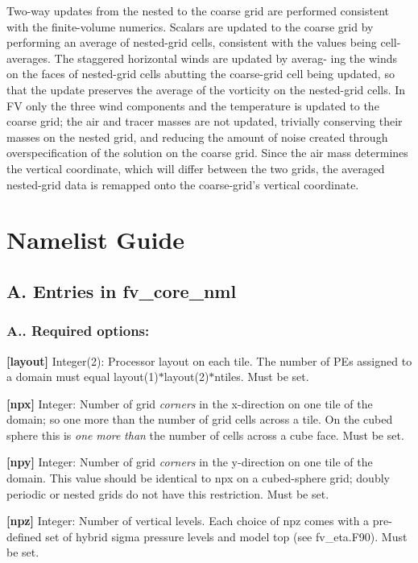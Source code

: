 Two-\/way updates from the nested to the coarse grid are performed consistent with the finite-\/volume numerics. Scalars are updated to the coarse grid by performing an average of nested-\/grid cells, consistent with the values being cell-\/averages. The staggered horizontal winds are updated by averag-\/ ing the winds on the faces of nested-\/grid cells abutting the coarse-\/grid cell being updated, so that the update preserves the average of the vorticity on the nested-\/grid cells. In FV\textthreesuperior{} only the three wind components and the temperature is updated to the coarse grid; the air and tracer masses are not updated, trivially conserving their masses on the nested grid, and reducing the amount of noise created through overspecification of the solution on the coarse grid. Since the air mass determines the vertical coordinate, which will differ between the two grids, the averaged nested-\/grid data is remapped onto the coarse-\/grid’s vertical coordinate. \hypertarget{namelist}{}\section{Namelist Guide}\label{namelist}
\subsection*{A. Entries in fv\+\_\+core\+\_\+nml}

\subsubsection*{A.. Required options\+:}

{\bfseries \mbox{[}layout\mbox{]}} Integer(2)\+: Processor layout on each tile. The number of P\+Es assigned to a domain must equal layout(1)$\ast$layout(2)$\ast$ntiles. Must be set.

{\bfseries \mbox{[}npx\mbox{]}} Integer\+: Number of grid {\itshape corners} in the x-\/direction on one tile of the domain; so one more than the number of grid cells across a tile. On the cubed sphere this is {\itshape one} {\itshape more} {\itshape than} the number of cells across a cube face. Must be set.

{\bfseries \mbox{[}npy\mbox{]}} Integer\+: Number of grid {\itshape corners} in the y-\/direction on one tile of the domain. This value should be identical to npx on a cubed-\/sphere grid; doubly periodic or nested grids do not have this restriction. Must be set.

{\bfseries \mbox{[}npz\mbox{]}} Integer\+: Number of vertical levels. Each choice of npz comes with a pre-\/defined set of hybrid sigma pressure levels and model top (see fv\+\_\+eta.\+F90). Must be set.

